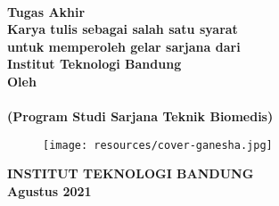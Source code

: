 \clearpage
\pagestyle{empty}


\begin{center}
    
    \smallskip
	\renewcommand{\baselinestretch}{1}
	
    \large{\bfseries \MakeUppercase{\thetitle}}
    \\[5\baselineskip]

    \large{\bfseries Tugas Akhir}
    \\[\baselineskip]
	
    \normalsize{ \bfseries
    	Karya tulis sebagai salah satu syarat\\
    	untuk memperoleh gelar sarjana dari\\
    	Institut Teknologi Bandung
	}
    \\[3\baselineskip]

    \normalsize{ \bfseries Oleh\\}
    \large{ 
    	\bfseries \MakeUppercase{\theauthor}\\
    	(Program Studi Sarjana Teknik Biomedis)
	}

    \vfill
    \begin{figure}[h]
        \centering
      	\texttt{[image: resources/cover-ganesha.jpg]}
    \end{figure}
    \vfill

    \large{ \bfseries
	    \uppercase{
	        Institut Teknologi Bandung\\
	    }
    	Agustus 2021
	}

\end{center}

\restoregeometry
\clearpage
